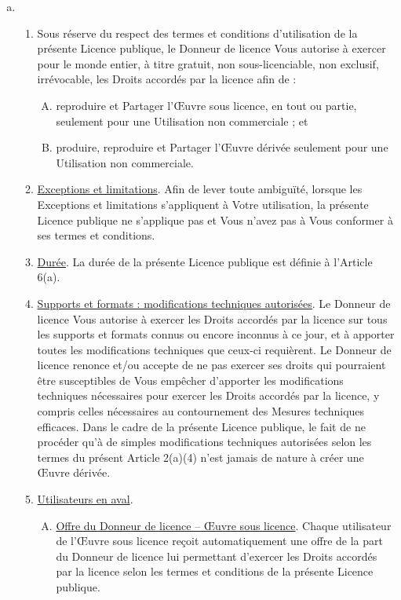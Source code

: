 
\begin{enumerate}[a.]
\item {}
\begin{enumerate}[1.]
\item Sous réserve du respect des termes et conditions d'utilisation de la présente Licence publique, le Donneur de licence Vous autorise à exercer pour le monde entier, à titre gratuit, non sous-licenciable, non exclusif, irrévocable, les Droits accordés par la licence afin de : 
\begin{enumerate}[A.]
\item reproduire et Partager l’Œuvre sous licence, en tout ou partie, seulement pour une Utilisation non commerciale ; et
\item produire, reproduire et Partager l’Œuvre dérivée seulement pour une Utilisation non commerciale.
\end{enumerate}
\item \uline{Exceptions et limitations}. Afin de lever toute ambiguïté, lorsque les Exceptions et limitations s’appliquent à Votre utilisation, la présente Licence publique ne s’applique pas et Vous n’avez pas à Vous conformer à ses termes et conditions.
\item \uline{Durée}. La durée de la présente Licence publique est définie à l’Article 6(a).
\item \uline{Supports et formats : modifications techniques autorisées}. Le Donneur de licence Vous autorise à exercer les Droits accordés par la licence sur tous les supports et formats connus ou encore inconnus à ce jour, et à apporter toutes les modifications techniques que ceux-ci requièrent. Le Donneur de licence renonce et/ou accepte de ne pas exercer ses droits qui pourraient être susceptibles de Vous empêcher d’apporter les modifications techniques nécessaires pour exercer les Droits accordés par la licence, y compris celles nécessaires au contournement des Mesures techniques efficaces. Dans le cadre de la présente Licence publique, le fait de ne procéder qu’à de simples modifications techniques autorisées selon les termes du présent Article 2(a)(4) n’est jamais de nature à créer une Œuvre dérivée.
\item \uline{Utilisateurs en aval}.
\begin{enumerate}[A.]
\item \uline{Offre du Donneur de licence -- Œuvre sous licence}. Chaque utilisateur de l’Œuvre sous licence reçoit automatiquement une offre de la part du Donneur de licence lui permettant d’exercer les Droits accordés par la licence selon les termes et conditions de la présente Licence publique.

\end{enumerate}
\end{enumerate}
\end{enumerate}
